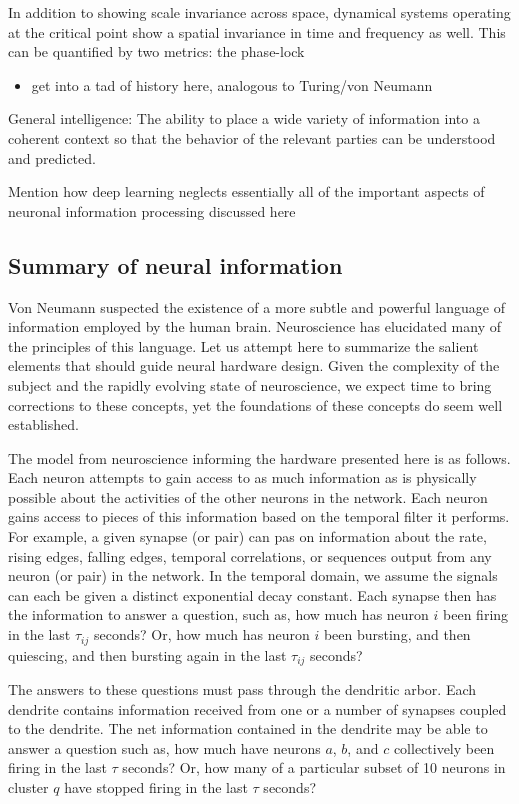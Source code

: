 \documentclass[twocolumn]{article}
\begin{document}
In addition to showing scale invariance across space, dynamical systems operating at the critical point show a spatial invariance in time and frequency as well. This can be quantified by two metrics: the phase-lock

\begin{itemize}
\item get into a tad of history here, analogous to Turing/von Neumann
\end{itemize}

General intelligence: The ability to place a wide variety of information into a coherent context so that the behavior of the relevant parties can be understood and predicted.

Mention how deep learning neglects essentially all of the important aspects of neuronal information processing discussed here




\subsection{Summary of neural information}
Von Neumann suspected the existence of a more subtle and powerful language of information employed by the human brain. Neuroscience has elucidated many of the principles of this language. Let us attempt here to summarize the salient elements that should guide neural hardware design. Given the complexity of the subject and the rapidly evolving state of neuroscience, we expect time to bring corrections to these concepts, yet the foundations of these concepts do seem well established.

The model from neuroscience informing the hardware presented here is as follows. Each neuron attempts to gain access to as much information as is physically possible about the activities of the other neurons in the network. Each neuron gains access to pieces of this information based on the temporal filter it performs. For example, a given synapse (or pair) can pas on information about the rate, rising edges, falling edges, temporal correlations, or sequences output from any neuron (or pair) in the network. In the temporal domain, we assume the signals can each be given a distinct exponential decay constant. Each synapse then has the information to answer a question, such as, how much has neuron $i$ been firing in the last $\tau_{ij}$ seconds? Or, how much has neuron $i$ been bursting, and then quiescing, and then bursting again in the last $\tau_{ij}$ seconds? 

The answers to these questions must pass through the dendritic arbor. Each dendrite contains information received from one or a number of synapses coupled to the dendrite. The net information contained in the dendrite may be able to answer a question such as, how much have neurons $a$, $b$, and $c$ collectively been firing in the last $\tau$ seconds? Or, how many of a particular subset of 10 neurons in cluster $q$ have stopped firing in the last $\tau$ seconds? 
\end{document}

